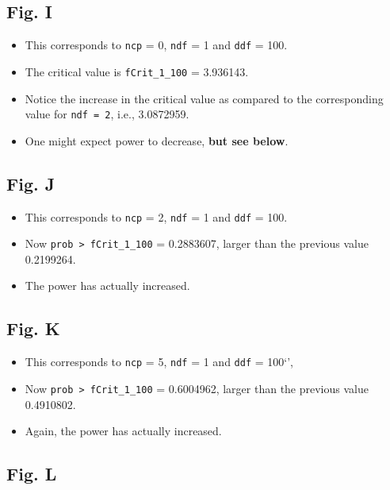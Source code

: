 \documentclass[
]{book}
\providecommand{\tightlist}{%
  \setlength{\itemsep}{0pt}\setlength{\parskip}{0pt}}
\begin{document}
\hypertarget{fig.-i}{%
\subsection{Fig. I}\label{fig.-i}}

\begin{itemize}
\tightlist
\item
  This corresponds to \texttt{ncp} = 0, \texttt{ndf} = 1 and \texttt{ddf} = 100.
\item
  The critical value is \texttt{fCrit\_1\_100} = 3.936143.
\item
  Notice the increase in the critical value as compared to the corresponding value for \texttt{ndf\ =\ 2}, i.e., 3.0872959.
\item
  One might expect power to decrease, \textbf{but see below}.
\end{itemize}

\hypertarget{fig.-j}{%
\subsection{Fig. J}\label{fig.-j}}

\begin{itemize}
\tightlist
\item
  This corresponds to \texttt{ncp} = 2, \texttt{ndf} = 1 and \texttt{ddf} = 100.
\item
  Now \texttt{prob\ \textgreater{}\ fCrit\_1\_100} = 0.2883607, larger than the previous value 0.2199264.
\item
  The power has actually increased.
\end{itemize}

\hypertarget{fig.-k}{%
\subsection{Fig. K}\label{fig.-k}}

\begin{itemize}
\tightlist
\item
  This corresponds to \texttt{ncp} = 5, \texttt{ndf} = 1 and \texttt{ddf} = 100`',
\item
  Now \texttt{prob\ \textgreater{}\ fCrit\_1\_100} = 0.6004962, larger than the previous value 0.4910802.
\item
  Again, the power has actually increased.
\end{itemize}

\hypertarget{fig.-l}{%
\subsection{Fig. L}\label{fig.-l}}
\end{document}

